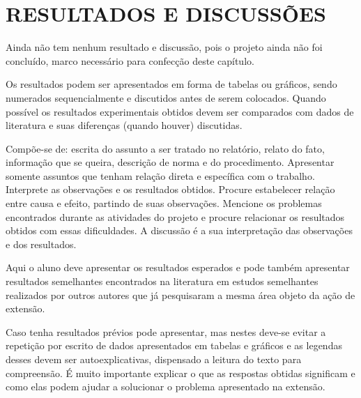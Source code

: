 \chapter{RESULTADOS E DISCUSSÕES}
\label{capitulo-resultados-discussoes}

    Ainda não tem nenhum resultado e discussão, pois o projeto ainda não foi concluído, marco necessário para confecção deste capítulo.
    
	Os resultados podem ser apresentados em forma de tabelas ou gráficos, sendo numerados sequencialmente e discutidos antes de serem colocados. Quando possível os resultados experimentais obtidos devem ser comparados com dados de literatura e suas diferenças (quando houver) discutidas.
	
	Compõe-se de: escrita do assunto a ser tratado no relatório, relato do fato, informação que se queira, descrição de norma e do procedimento. Apresentar somente assuntos que tenham relação direta e específica com o trabalho. 	Interprete as observações e os resultados obtidos. Procure estabelecer relação entre causa e efeito, partindo de suas observações. Mencione os problemas encontrados durante as atividades do projeto e procure relacionar os resultados obtidos com essas dificuldades. A discussão é a sua interpretação das observações e dos resultados. 
	
	Aqui o aluno deve apresentar os resultados esperados e pode também apresentar resultados semelhantes encontrados na literatura em estudos semelhantes realizados por outros autores que já pesquisaram a mesma área objeto da ação de extensão. 
	
	Caso tenha resultados prévios pode apresentar, mas nestes deve-se evitar a repetição por escrito de dados apresentados em tabelas e gráficos e as legendas desses devem ser autoexplicativas, dispensado a leitura do texto para compreensão. É muito importante explicar o que as respostas obtidas significam e como elas podem ajudar a solucionar o problema apresentado na extensão.
